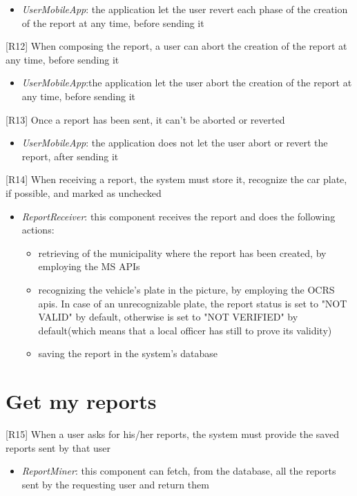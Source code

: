 					\begin{itemize}
						\item \textit{UserMobileApp}: the application let the user revert each phase of the creation of the report at any time, before sending it
					\end{itemize}
			{[R12]} When composing the report, a user can abort the creation of the report at any time, before sending it
					\begin{itemize}
						\item \textit{UserMobileApp}:the application let the user abort the creation of the report at any time, before sending it
					\end{itemize}
			{[R13]} Once a report has been sent, it can't be aborted or reverted
					\begin{itemize}
						\item \textit{UserMobileApp}: the application does not let the user abort or revert the report, after sending it
					\end{itemize}
			{[R14]} When receiving a report, the system must store it, recognize the car plate, if possible, and marked as unchecked
					\begin{itemize}
						\item \textit{ReportReceiver}: this component receives the report and does the following actions:
							\begin{itemize}
								\item retrieving of the municipality where the report has been created, by employing the MS APIs
								\item recognizing the vehicle's plate in the picture, by employing the OCRS apis. In case of an unrecognizable plate, the report status is set to "NOT VALID" by default, otherwise is set to "NOT VERIFIED" by default(which means that a local officer has still to prove its validity)
								\item saving the report in the system's database
							\end{itemize}
					\end{itemize}

		\section{Get my reports}
			{[R15]} When a user asks for his/her reports, the system must provide the saved reports sent by that user
					\begin{itemize}
						\item \textit{ReportMiner}: this component can fetch, from the database, all the reports sent by the requesting user and return them
					\end{itemize}
